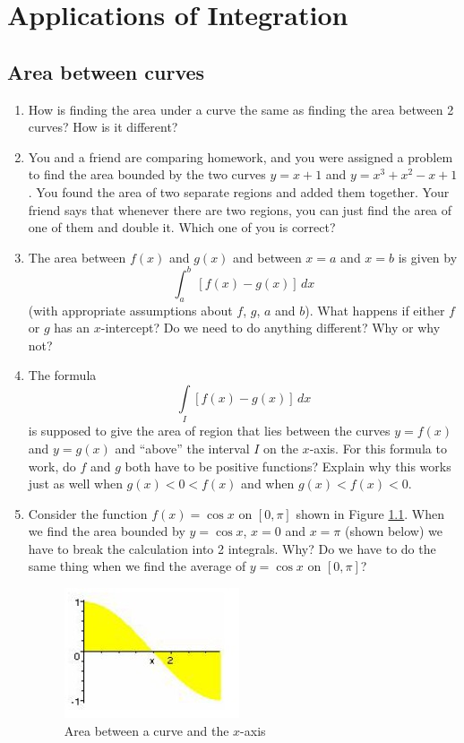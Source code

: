 \chapter{Applications of Integration}
\section{Area between curves}\begin{enumerate}

\item  How is finding the area under a curve the same as finding the area between 2 curves?  How is it different?

\item You and a friend are comparing homework, and you were assigned a problem to find the area bounded by the two curves $y = x + 1$ and  $
y = x^3  + x^2  - x + 1$.  You found the area of two separate regions and added them together.  Your friend says that whenever there are two regions, you can just find the area of one of them and double it.  Which one of you is correct?

\item  The area between $f(x)$ and $g(x)$ and between $x = a$ and $x = b$ is given by $$\int_a^b {\,\left[ {f(x) - g\left( x \right)} \right]\,dx} $$ (with appropriate assumptions about $f$, $g$, $a$ and $b$).  What happens if either $f$ or $g$ has an $x$-intercept?  Do we need to do anything different?  Why or why not?

\item  The formula $$\int\limits_I {\left[ {f\left( x \right) - g\left( x \right)} \right]\,dx} $$ is supposed to give the area of region that lies between the curves $y = f(x)$ and $y = g(x)$ and ``above'' the interval $I$ on the $x$-axis.  For this formula to work, do $f$ and $g$ both have to be positive functions?  Explain why this works just as well when $g(x) < 0 < f(x)$ and when $g(x) < f(x) < 0$.

\item  Consider the function $f(x) = \cos x$ on $[0, \pi]$ shown in Figure \ref{Chapter6Fig}.  When we find the area bounded by $y = \cos x$, $x = 0$ and $x = \pi$ (shown below) we have to break the calculation into 2 integrals.  Why?  Do we have to do the same thing when we find the average of  $y = \cos x$ on $[0, \pi]$?

 \begin{figure}[ht]
	\centering
		\includegraphics{TeXGraphics/Chapter6Fig.jpg}
	\caption{Area between a curve and the $x$-axis}
	\label{Chapter6Fig}
\end{figure}
 

\end{enumerate}
